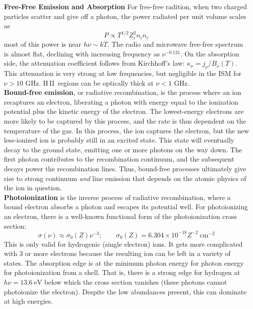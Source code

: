\documentclass[10pt]{article}
\numberwithin{equation}{section}
\newcommand{\n}{\noindent}
\newcommand{\HII}{H\,II\ }
\begin{document}
\n \textbf{Free-Free Emission and Absorption}
For free-free radition, when two charged particles scatter and give off a
photon, the power radiated per unit volume scales as
\begin{equation}
  \label{eq:ffree:1} P\propto T^{1/2} Z_i^2 n_i n_e
\end{equation}
most of this power is near $h\nu\sim kT$. The radio and microwave free-free
spectrum is almost flat, declining with increasing frequency as $\nu^{-0.121}$.
On the absorption side, the attenuation coefficient follows from Kirchhoff's
law: $\kappa_\nu = j_\nu/B_\nu(T)$. This attenuation is very strong at low
frequencies, but negligible in the ISM for $\nu > 10$ GHz. \HII regions can be
optically thick at $\nu < 1$ GHz.\\

\n \textbf{Bound-free emission}, or radiative recombination, is the process
where an ion recaptures an electron, liberating a photon with energy equal to
the ionization potential plus the kinetic energy of the electron. The
lowest-energy electrons are more likely to be captured by this process, and the
rate is thus dependent on the temperature of the gas. In this process, the ion
captures the electron, but the new less-ionized ion is probably still in an
excited state. This state will eventually decay to the ground state, emitting
one or more photons on the way down. The first photon contributes to the
recombination continuum, and the subsequent decays power the recombination
lines. Thus, bound-free processes ultimately give rise to strong continuum
\emph{and} line emission that depends on the atomic physics of the ion in
question.\\

\n \textbf{Photoionization} is the inverse process of radiative recombination,
where a bound electron absorbs a photon and escapes its potential well. For
photoionizing an electron, there is a well-known functional form of the
photoionization cross section:
\begin{equation}
  \label{eq:photoion:1} \sigma(\nu) \approx \sigma_0(Z)\nu^{-3};\qquad
  \sigma_0(Z) = 6.304\times 10^{-18}Z^{-2}\ \mathrm{cm^{-2}}
\end{equation}
This is only valid for hydrogenic (single electron) ions. It gets more
complicated with 3 or more electrons because the resulting ion can be left in a
variety of states. The absorption edge is at the minimum photon energy for
photon energy for photoionization from a shell. That is, there is a strong edge
for hydrogen at $h\nu = 13.6\ \mathrm{eV}$ below which the cross section
vanishes (these photons cannot photoionize the electron). Despite the low
abundances present, this can dominate at high energies.\\
\end{document}
